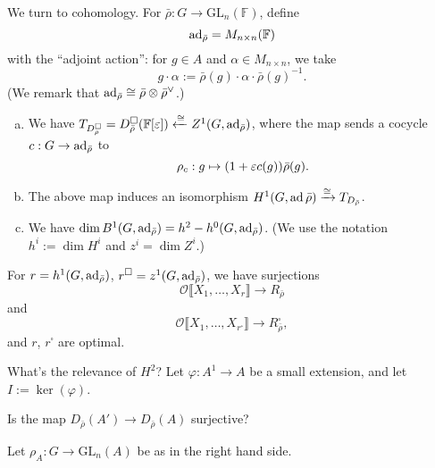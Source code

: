 \documentclass[reqno]{amsart} 
\begin{document}
We turn to cohomology.  For $\bar{\rho} : G \rightarrow \mathrm{GL}_n(\mathbb{F})$, define
\begin{equation*}
  \operatorname{ad}_{\bar{\rho}} = M_{n \times n}(\mathbb{F})
\end{equation*}
with the ``adjoint action'': for $g \in A$ and $\alpha \in M_{n \times n}$, we take
\begin{equation*}
  g \cdot \alpha := \bar{\rho}(g) \cdot \alpha \cdot \bar{\rho}(g)^{-1}.
\end{equation*}
(We remark that $\operatorname{ad}_{\bar{\rho}} \cong \bar{\rho} \otimes \bar{\rho}^\vee$.)
\begin{proposition}
  \begin{enumerate}[(a)]
  \item We have $T_{D_\rho^{\square}} = D_{\bar{\rho}}^{\square}(\mathbb{F}[\varepsilon]) \xleftarrow{\cong} Z^1(G, \operatorname{ad}_{\bar{\rho}})$, where the map sends a cocycle $c : G \rightarrow \operatorname{ad}_{\bar{\rho}}$ to
    \begin{equation*}
      \rho_c : g \mapsto(1 + \varepsilon c(g)) \bar{\rho}(g).
    \end{equation*}
  \item The above map induces an isomorphism $H^1(G, \operatorname{ad} \bar{\rho}) \xrightarrow{\cong} T_{D_{\bar{\rho}}}$.
  \item We have $\dim B^1(G, \operatorname{ad}_{\bar{\rho}}) = h^2 - h^0(G, \operatorname{ad}_{\bar{\rho}})$.  (We use the notation $h^i := \dim H^i$ and $z^i = \dim Z^i$.)
  \end{enumerate}
\end{proposition}
\begin{corollary}
  For $r = h^1(G, \operatorname{ad}_{\bar{\rho}})$, $r^{\square} = z^1(G, \operatorname{ad}_{\bar{\rho}})$, we have surjections
  \begin{equation*}
    \mathcal{O} \llbracket X_1, \dotsc, X_r \rrbracket \rightarrow R_{\bar{\rho}}
  \end{equation*}
  and
  \begin{equation*}
    \mathcal{O} \llbracket X_1, \dotsc, X_{r^{\square}} \rrbracket \rightarrow R_{\bar{\rho}}^{\square},
  \end{equation*}
  and $r$, $r^{\square}$ are optimal.
\end{corollary}
What's the relevance of $H^2$?  Let $\varphi : A^1 \rightarrow A$ be a small extension, and let $I := \ker(\varphi)$.
\begin{question}
  Is the map $D_{\bar{\rho}}(A') \rightarrow D_{\bar{\rho}}(A)$ surjective?
\end{question}
Let $\rho_A : G \rightarrow \mathrm{GL}_n(A)$ be as in the right hand side.
\end{document}
